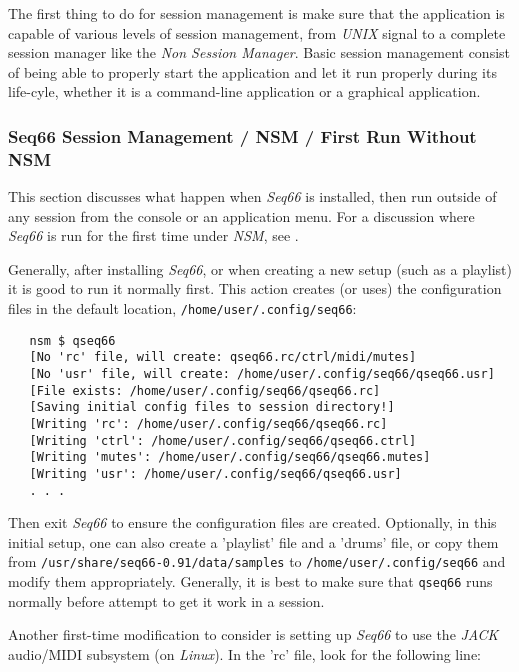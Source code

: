    The first thing to do for session management is make sure that the
   application is capable of various levels of session management, from
   \textsl{UNIX} signal to
   a complete session manager like the \textsl{Non Session Manager}.
   Basic session management consist of being able to properly start the
   application and let it run properly during its life-cyle, whether it is a
   command-line application or a graphical application.

\subsubsection{Seq66 Session Management / NSM / First Run Without NSM}
\label{subsec:sessions_nsm_first_run_without_nsm}

   This section discusses what happen when \textsl{Seq66} is installed, then
   run outside of any session from the console or an application menu.
   For a discussion where \textsl{Seq66} is run for the first time under
   \textsl{NSM},
   see .

   Generally, after installing \textsl{Seq66}, or when creating a new setup
   (such as a playlist) it is good to run it normally first.  This action
   creates (or uses) the configuration files in the default location,
   \texttt{/home/user/.config/seq66}:

\begin{verbatim}
   nsm $ qseq66 
   [No 'rc' file, will create: qseq66.rc/ctrl/midi/mutes]
   [No 'usr' file, will create: /home/user/.config/seq66/qseq66.usr]
   [File exists: /home/user/.config/seq66/qseq66.rc]
   [Saving initial config files to session directory!]
   [Writing 'rc': /home/user/.config/seq66/qseq66.rc]
   [Writing 'ctrl': /home/user/.config/seq66/qseq66.ctrl]
   [Writing 'mutes': /home/user/.config/seq66/qseq66.mutes]
   [Writing 'usr': /home/user/.config/seq66/qseq66.usr]
   . . .
\end{verbatim}

   Then exit \textsl{Seq66} to ensure the configuration files are created.
   Optionally, in this initial setup,
   one can also create a 'playlist' file and a 'drums' file, or
   copy them from \texttt{/usr/share/seq66-0.91/data/samples} to
   \texttt{/home/user/.config/seq66} and modify them appropriately.
   Generally, it is best to make sure that \texttt{qseq66} runs normally before
   attempt to get it work in a session.

   Another first-time modification to consider is setting up \textsl{Seq66} to
   use the \textsl{JACK} audio/MIDI subsystem (on \textsl{Linux}).
   In the 'rc' file, look for the following line:

